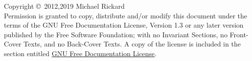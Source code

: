 \vspace*{6in}

Copyright \copyright~2012,2019 Michael Rickard \\

Permission is granted to copy, distribute and/or modify this document
under the terms of the GNU Free Documentation License, Version 1.3
or any later version published by the Free Software Foundation;
with no Invariant Sections, no Front-Cover Texts, and no Back-Cover
Texts.  A copy of the license is included in the section entitled
\hyperlink{license}{GNU Free Documentation License}.

